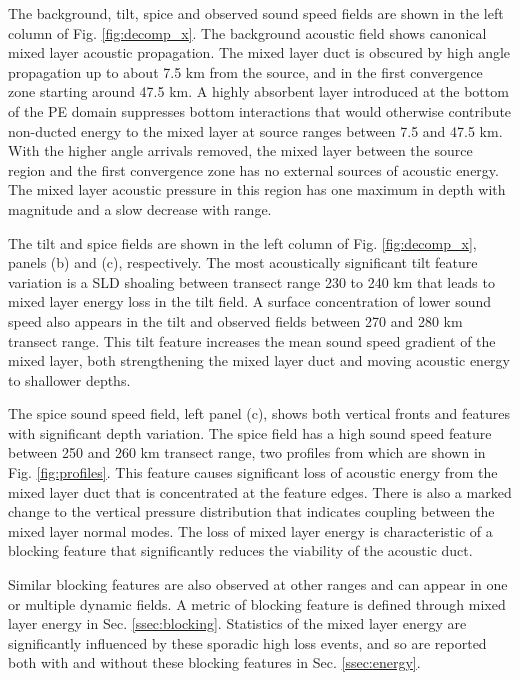 \documentclass[preprint,NumberedRefs]{JASA}
\begin{document}
The background, tilt, spice and observed sound speed fields are shown in the left column of Fig. \ref{fig:decomp_x}. The background acoustic field shows canonical mixed layer acoustic propagation. The mixed layer duct is obscured by high angle propagation up to about 7.5 km from the source, and in the first convergence zone starting around 47.5 km. A highly absorbent layer introduced at the bottom of the PE domain suppresses bottom interactions that would otherwise contribute non-ducted energy to the mixed layer at source ranges between 7.5 and 47.5 km. With the higher angle arrivals removed, the mixed layer between the source region and the first convergence zone has no external sources of acoustic energy. The mixed layer acoustic pressure in this region has one maximum in depth with magnitude and a slow decrease with range.

The tilt and spice fields are shown in the left column of Fig. \ref{fig:decomp_x}, panels (b) and (c), respectively. The most acoustically significant tilt feature variation is a SLD shoaling between transect range 230 to 240 km that leads to mixed layer energy loss in the tilt field. A surface concentration of lower sound speed also appears in the tilt and observed fields between 270 and 280 km transect range. This tilt feature increases the mean sound speed gradient of the mixed layer, both strengthening the mixed layer duct and moving acoustic energy to shallower depths.

The spice sound speed field, left panel (c), shows both vertical fronts and features with significant depth variation. The spice field has a high sound speed feature between 250 and 260 km transect range, two profiles from which are shown in Fig. \ref{fig:profiles}. This feature causes significant loss of acoustic energy from the mixed layer duct that is concentrated at the feature edges. There is also a marked change to the vertical pressure distribution that indicates coupling between the mixed layer normal modes. The loss of mixed layer energy is characteristic of a blocking feature that significantly reduces the viability of the acoustic duct.

Similar blocking features are also observed at other ranges and can appear in one or multiple dynamic fields. A metric of blocking feature is defined through mixed layer energy in Sec. \ref{ssec:blocking}. Statistics of the mixed layer energy are significantly influenced by these sporadic high loss events, and so are reported both with and without these blocking features in Sec. \ref{ssec:energy}.
\end{document}
